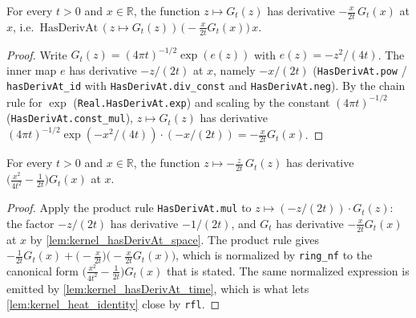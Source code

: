 \begin{lemma}
    \label{lem:kernel_hasDerivAt_space}
    \leanok
    For every $t > 0$ and $x \in \mathbb{R}$, the function $z \mapsto G_t(z)$ has
    derivative $-\tfrac{x}{2t}\,G_t(x)$ at $x$, i.e.\
    $\mathrm{HasDerivAt}\,(z \mapsto G_t(z))\,\bigl(-\tfrac{x}{2t} G_t(x)\bigr)\, x$.
\end{lemma}
\begin{proof}
    Write $G_t(z) = (4\pi t)^{-1/2}\exp(e(z))$ with $e(z) = -z^2/(4t)$. The inner
    map $e$ has derivative $-z/(2t)$ at $x$, namely $-x/(2t)$
    (\texttt{HasDerivAt.pow} / \texttt{hasDerivAt\_id} with
    \texttt{HasDerivAt.div\_const} and \texttt{HasDerivAt.neg}). By the chain rule
    for $\exp$ (\texttt{Real.HasDerivAt.exp}) and scaling by the constant
    $(4\pi t)^{-1/2}$ (\texttt{HasDerivAt.const\_mul}), $z \mapsto G_t(z)$ has
    derivative $(4\pi t)^{-1/2}\exp(-x^2/(4t))\cdot(-x/(2t)) = -\tfrac{x}{2t} G_t(x)$.
\end{proof}

\begin{lemma}
    \label{lem:kernel_hasDerivAt_space_second}
    \leanok
    For every $t > 0$ and $x \in \mathbb{R}$, the function
    $z \mapsto -\tfrac{z}{2t}\,G_t(z)$ has derivative
    $\bigl(\tfrac{x^2}{4t^2} - \tfrac{1}{2t}\bigr) G_t(x)$ at $x$.
\end{lemma}
\begin{proof}
    Apply the product rule \texttt{HasDerivAt.mul} to $z \mapsto (-z/(2t))\cdot G_t(z)$:
    the factor $-z/(2t)$ has derivative $-1/(2t)$, and $G_t$ has derivative
    $-\tfrac{x}{2t} G_t(x)$ at $x$ by \cref{lem:kernel_hasDerivAt_space}. The product
    rule gives
    $-\tfrac{1}{2t}G_t(x) + \bigl(-\tfrac{x}{2t}\bigr)\bigl(-\tfrac{x}{2t}G_t(x)\bigr)$,
    which is normalized by \texttt{ring\_nf} to the canonical form
    $\bigl(\tfrac{x^2}{4t^2} - \tfrac{1}{2t}\bigr) G_t(x)$ that is stated. The same
    normalized expression is emitted by \cref{lem:kernel_hasDerivAt_time}, which is
    what lets \cref{lem:kernel_heat_identity} close by \texttt{rfl}.
\end{proof}

